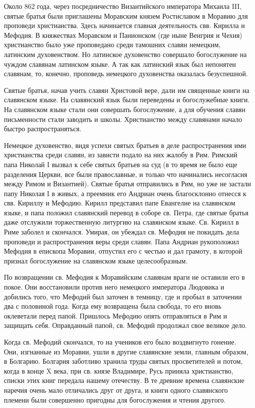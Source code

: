 \documentclass[11pt,a4paper,oneside]{memoir}
\begin{document}
Около 862 года, через посредничество Византийского императора Михаила III, святые братья были приглашены Моравским князем Ростиславом в Моравию для проповеди христианства. Здесь начинается главная деятельность свв. Кирилла и Мефодия. В княжествах Моравском и Панионском (где ныне Венгрия и Чехия) христианство было уже проповедано среди тамошних славян немецким, латинским духовенством. Но латинское духовенство совершало богослужение на чуждом славянам латинском языке. А так как латинский язык был непонятен славянам, то, конечно, проповедь немецкого духовенства оказалась безуспешной.

Святые братья, начав учить славян Христовой вере, дали им священные книги на славянском языке. На славянский язык были переведены и богослужебные книги. На славянском языке стали они совершать богослужение, а для обучения славян письменности стали заводить и школы. Христианство между славянами начало быстро распространяться.

Немецкое духовенство, видя успехи святых братьев в деле распространения ими христианства среди славян, из зависти подало на них жалобу в Рим. Римский папа Николай I вызвал к себе святых братьев на суд (в то время не было еще разделения Церкви, все были православные, и только что начинались несогласия между Римом и Византией). Святые братья отправились в Рим, но уже не застали папу Николая I в живых, а преемник его Андриан очень благосклонно отнесся к свв. Кириллу и Мефодию. Кирилл представил папе Евангелие на славянском языке, и папа положил славянский перевод в соборе св. Петра, где святые братья даже отслужили торжественную литургию на славянском языке. Св. Кирилл в Риме заболел и скончался. Умирая, он убеждал св. Мефодия не покидать дела проповеди и распространения веры среди славян. Папа Андриан рукоположил Мефодия в епископа Моравии, отпустил его с честью и дал грамоту, в которой признал богослужение на славянском языке целесообразным.

По возвращении св. Мефодия к Моравийским славянам враги не оставили его в покое. Они восстановили против него немецкого императора Людовика и добились того, что Мефодий был заточен в темницу, где и пробыл в заточении два с половиной года. Когда ему возвращена была свобода, то его вновь оклеветали перед папой. Пришлось Мефодию опять отправляться в Рим и защищать себя. Оправданный папой, св. Мефодий продолжал свое великое дело.

Когда св. Мефодий скончался, то на учеников его было воздвигнуто гонение. Они, изгнанные из Моравии, ушли в другие славянские земли, главным образом, в Болгарию. Болгария заботливо хранила труды святых просветителей и потом, когда в конце X века, при св. князе Владимире, Русь приняла христианство, списки этих книг передала нашему отечеству. В те древние времена славянские наречия очень мало отличались друг от друга, и книги одного славянского племени были совершенно пригодны для богослужения и чтения другого.
\end{document}
